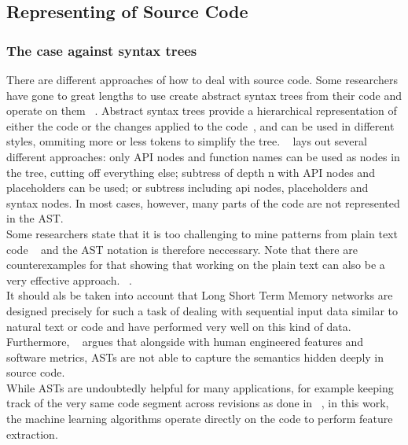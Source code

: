 \documentclass[
	a4paper,
	pagesize,
	pdftex,
	12pt,
	twoside, %
	BCOR=5mm, %
	ngerman,
	fleqn,
	final,
	]{scrartcl}
\begin{document}
\subsection{Representing of Source Code}


\subsubsection{The case against syntax trees}
There are different approaches of how to deal with source code. Some researchers have gone to great lengths to use create abstract syntax trees from their code and operate on them ~\cite{Ma.2017,Yamaguchi.2012}. Abstract syntax trees provide a hierarchical representation of either the code or the changes applied to the code~\cite{Liu.2018}, and can be used in different styles, ommiting more or less tokens to simplify the tree. ~\cite{Yamaguchi.2012} lays out several different approaches: only API nodes and function names can be used as nodes in the tree, cutting off everything else; subtress of depth n with API nodes and placeholders can be used; or subtress including api nodes, placeholders and syntax nodes. In most cases, however, many parts of the code are not represented in the AST.\\
Some researchers state that it is too challenging to mine patterns from plain text code ~\cite{Liu.2018} and the AST notation is therefore neccessary. Note that there are counterexamples for that showing that working on the plain text can also be a very effective approach. ~\cite{Russell.2018,Hovsepyan.2012}.\\
It should als be taken into account that Long Short Term Memory networks are designed precisely for such a task of dealing with sequential input data similar to natural text or code and have performed very well on this kind of data. Furthermore, ~\cite{Dam.2016} argues that alongside with human engineered features and software metrics, ASTs are not able to capture the semantics hidden deeply in source code. \\
While ASTs are undoubtedly helpful for many applications, for example keeping track of the very same code segment across revisions as done in ~\cite{Liu.2018}, in this work, the machine learning algorithms operate directly on the code to perform feature extraction. 
\end{document}
